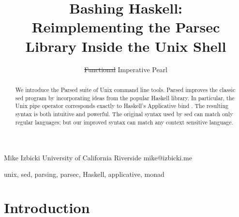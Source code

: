 \documentclass{sigplanconf}
\newcommand{\parsed}{{\ttfamily parsed}~}
\newcommand{\sh}[1]{{\ttfamily {#1}}}
\begin{document}
\setlength{\pdfpageheight}{\paperheight}
\setlength{\pdfpagewidth}{\paperwidth}


\title{Bashing Haskell: \\Reimplementing the Parsec Library Inside the Unix Shell}
\subtitle{\sout{Functional} Imperative Pearl}
\authorinfo
    {Mike Izbicki}
    {University of California Riverside}
    {mike@izbicki.me}

\maketitle

\begin{abstract}
We introduce the Parsed suite of Unix command line tools.
Parsed improves the classic sed program by incorporating ideas from the popular \sh{parsec} Haskell library.
In particular, the Unix pipe operator \sh{(|)} corresponds exactly to Haskell's Applicative bind \sh{(*>)}.
The resulting syntax is both intuitive and powerful.
The original syntax used by sed can match only regular languages;
but our improved syntax can match any context sensitive language.
\end{abstract}

\keywords unix, sed, parsing, parsec, Haskell, applicative, monad

\section{Introduction}
\end{document}
